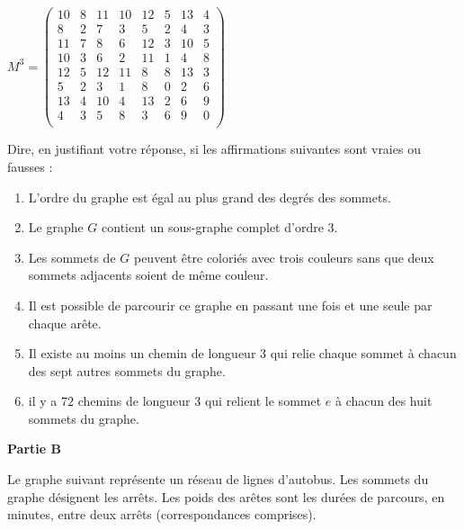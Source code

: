 \bigskip
\begin{center}
 $M^3 = \begin{pmatrix}
    10  &   8   &   11  &   10  &   12  &   5   &   13  &   4\\
    8   &   2   &   7   &   3   &   5   &   2   &   4   &   3\\
    11  &   7   &   8   &   6   &   12  &   3   &   10  &   5\\
    10  &   3   &   6   &   2   &   11  &   1   &   4   &   8\\
    12  &   5   &   12  &   11  &   8   &   8   &   13  &   3\\
    5   &   2   &   3   &   1   &   8   &   0   &   2   &   6\\
    13  &   4   &   10  &   4   &   13  &   2   &   6   &   9\\
    4   &   3   &   5   &   8   &   3   &   6   &   9   &   0\\
\end{pmatrix}$
\end{center}


\bigskip
Dire, en justifiant votre réponse, si les affirmations suivantes sont vraies ou
 fausses :

\begin{enumerate}
\item L'ordre du graphe est égal au plus grand des degrés des sommets.
\item Le graphe $G$ contient un sous-graphe complet d'ordre $3$.
\item Les sommets de $G$ peuvent être coloriés avec trois couleurs sans que deux sommets adjacents soient de même couleur.
\item Il est possible de parcourir ce graphe en passant une fois et une seule par chaque arête.
\item Il existe au moins un chemin de longueur $3$ qui relie chaque sommet à chacun  des sept autres sommets du graphe.
\item il y a $72$ chemins de longueur $3$ qui relient le sommet $e$ à chacun des huit sommets du graphe.
\end{enumerate}

\newpage

\textbf{ Partie B}

Le graphe suivant représente un réseau de lignes d'autobus. Les sommets du graphe désignent les arrêts. Les poids des arêtes sont les durées de parcours,  en minutes, entre deux arrêts (correspondances comprises).

